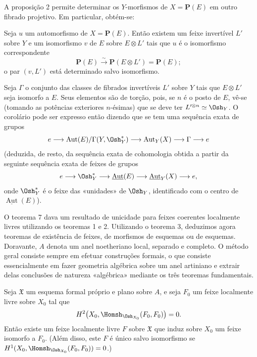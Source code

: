 A proposição 2 permite determinar os $Y$-morfismos de $X=\mathbf P(E)$ em
outro fibrado projetivo. Em particular, obtém-se:

 Seja $u$ um automorfismo de $X=\mathbf P(E)$. Então
existem um feixe invertível $L'$ sobre $Y$ e um isomorfismo $v$ de $E$ sobre
$E\otimes L'$ tais que $u$ é o isomorfismo correspondente
\[
  \mathbf P(E)\xrightarrow{\sim}\mathbf P(E\otimes L')=\mathbf P(E);
\]
o par $(v,L')$ está determinado salvo isomorfismo.

Seja $\Gamma$ o conjunto das classes de fibrados invertíveis $L'$ sobre $Y$
tais que $E\otimes L'$ seja isomorfo a $E$. Seus elementos são de torção, pois,
se $n$ é o posto de $E$, vê-se (tomando as potências exteriores $n$-ésimas)
que se deve ter $L'^{\otimes n}\simeq\Osh_Y$. O corolário pode ser expresso
então dizendo que se tem uma sequência exata de grupos
\[
  e\longrightarrow
  \operatorname{Aut}(E)/\Gamma(Y,\Osh_Y^*)
  \longrightarrow \operatorname{Aut}_Y(X)
  \longrightarrow \Gamma\longrightarrow e
\]
(deduzida, de resto, da sequência exata de cohomologia obtida a partir
da seguinte sequência exata de feixes de grupos
\[
  e\longrightarrow \Osh_Y^*
  \longrightarrow \underline{\operatorname{Aut}}(E)
  \longrightarrow \underline{\operatorname{Aut}}_Y(X)
  \longrightarrow e,
\]
onde $\Osh_Y^*$ é o feixe das «unidades» de $\Osh_Y$, identificado com o
centro de $\underline{\operatorname{Aut}}(E)$).


O teorema 7 dava um resultado de unicidade para feixes coerentes localmente
livres utilizando os teoremas 1 e 2. Utilizando o teorema 3, deduzimos agora
teoremas de existência de feixes, de morfismos de esquemas ou de esquemas.
Doravante, $A$ denota um anel noetheriano local, separado e completo. O método
geral consiste sempre em efetuar construções formais, o que consiste
essencialmente em fazer geometria algébrica sobre um anel artiniano e extrair
delas conclusões de natureza «algébrica» mediante os três teoremas
fundamentais.

 Seja $\mathfrak X$ um esquema formal próprio e plano
sobre $A$, e seja $F_0$ um feixe localmente livre sobre $X_0$ tal que
\[
  H^2\bigl(X_0,\Homsh_{\Osh_{X_0}}(F_0,F_0)\bigr)=0.
\]
Então existe um feixe localmente livre $F$ sobre $\mathfrak X$ que induz
sobre $X_0$ um feixe isomorfo a $F_0$. (Além disso, este $F$ é único salvo
isomorfismo se
$H^1(X_0,\Homsh_{\Osh_{X_0}}(F_0,F_0))=0$.)

